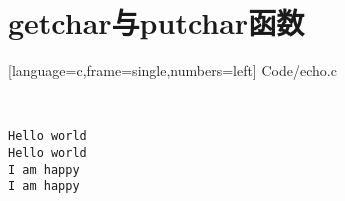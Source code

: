 \section{getchar与putchar函数}

\begin{frame}[fragile]\ft{\secname}
  \begin{minipage}{0.65\textwidth}
    
    [language=c,frame=single,numbers=left]
    {Code/echo.c}    
  \end{minipage}~~\pause 
  \begin{minipage}{0.3\textwidth}
    \begin{lstlisting}[backgroundcolor=\color{blue!20}]
Hello world 
Hello world
I am happy
I am happy
\end{lstlisting}    
  \end{minipage}
\end{frame}
